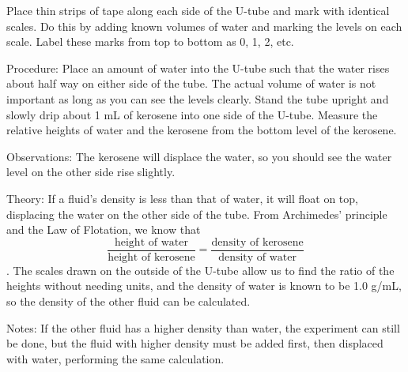 \begin{multicols}{2}
\begin{description*}
{Place thin strips of tape along each side of the U-tube and mark with identical scales. Do this by adding known volumes of water and marking the levels on each scale. Label these marks from top to bottom as 0, 1, 2, etc.}
\item[Procedure:]{Place an amount of water into the U-tube such that the water rises about half way on either side of the tube. The actual volume of water is not important as long as you can see the levels clearly. Stand the tube upright and slowly drip about 1 mL of kerosene into one side of the U-tube. Measure the relative heights of water and the kerosene from the bottom level of the kerosene.}
\item[Observations:]{The kerosene will displace the water, so you should see the water level on the other side rise slightly.}
\item[Theory:]{If a fluid’s density is less than that of water, it will float on top, displacing the water on the other side of the tube. From Archimedes’ principle and the Law of Flotation, we know that \[ \frac{\text{height of water}}{\text{height of kerosene}} = \frac{\text{density of kerosene}}{\text{density of water}} \]. The scales drawn on the outside of the U-tube allow us to find the ratio of the heights without needing units, and the density of water is known to be 1.0 g/mL, so the density of the other fluid can be calculated.}
\item[Notes:]{If the other fluid has a higher density than water, the experiment can still be done, but the fluid with higher density must be added first, then displaced with water, performing the same calculation.}
\end{description*}

\end{multicols}

\pagebreak